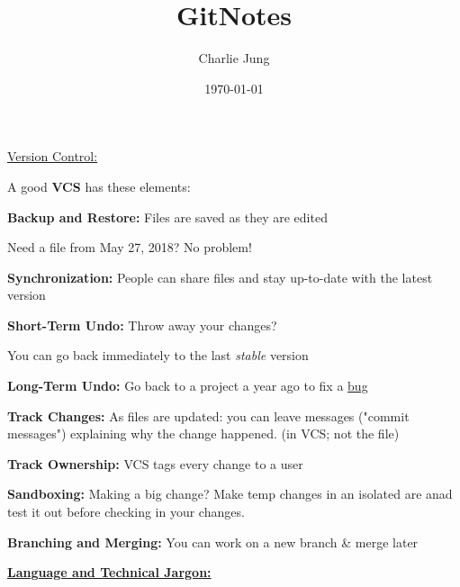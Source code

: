 \documentclass{article}
\title{GitNotes}
\author{Charlie Jung}
\date{\today}
\begin{document}
\maketitle
\newpage
\begin{flushedleft}

\underline{Version Control:} \\
\par

A good \textbf{VCS} has these elements: \\
\par

\textbf{Backup and Restore:} Files are saved as they are edited \par
Need a file from May 27, 2018? No problem! \\
\par

\textbf{Synchronization:} People can share files and stay up-to-date with the latest version \\
\par

\textbf{Short-Term Undo:} Throw away your changes? \par
You can go back immediately to the last \textit{stable} version \\
\par

\textbf{Long-Term Undo:} Go back to a project a year ago to fix a \underline{bug} \\
\par

\textbf{Track Changes:} As files are updated: you can leave messages ("commit messages") explaining why the change happened. (in VCS; not the file) \\
\par

\textbf{Track Ownership:} VCS tags every change to a user \\
\par

\textbf{Sandboxing:} Making a big change? Make temp changes in an isolated are anad test it out before checking in your changes. \\
\par

\textbf{Branching and Merging:} You can work on a new branch & merge later \\
\par

\textbf{\underline{Language and Technical Jargon:}} \\
\par


\end{flushedleft}
\end{document}
